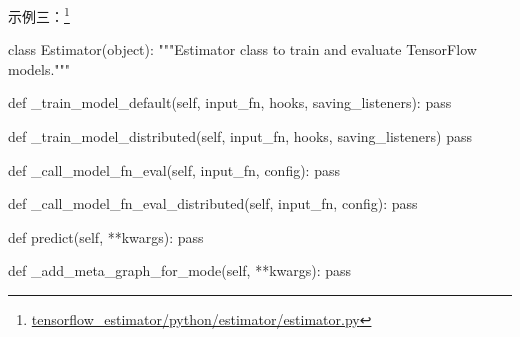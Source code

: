 \begin{frame}[fragile]
    示例三：\footnote{\href{https://github.com/tensorflow/estimator/blob/1c73cff04a2af22a12d778a525038261879482e4/tensorflow\_estimator/python/estimator/estimator.py\#L76}{tensorflow\_estimator/python/estimator/estimator.py}}

    \begin{tcblisting}{}
        class Estimator(object):
          """Estimator class to train and evaluate TensorFlow models."""

          def _train_model_default(self, input_fn, hooks, saving_listeners):
            pass

          def _train_model_distributed(self, input_fn, hooks, saving_listeners)
            pass

          def _call_model_fn_eval(self, input_fn, config):
            pass

          def _call_model_fn_eval_distributed(self, input_fn, config):
            pass

          def predict(self, **kwargs):
            pass

          def _add_meta_graph_for_mode(self, **kwargs):
            pass
    \end{tcblisting}
\end{frame}
